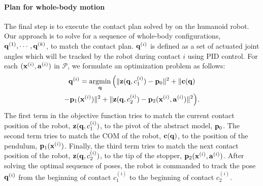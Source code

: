 \paragraph{Plan for whole-body motion}
The final step is to execute the contact plan solved by
 on the humanoid robot.  Our approach is to solve
for a sequence of whole-body configurations,
$\mathbf{q}^{(1)}, \cdots, \mathbf{q}^{(k)}$, to match the contact
plan. 
$\mathbf{q}^{(i)}$ is defined as a set of actuated joint angles
which will be tracked by the robot during contact $i$ using PID
control. For each $(\mathbf{x}^{(i)}, \mathbf{a}^{(i)})$ in $\mathcal{P}$, we
formulate an optimization problem as follows:
\begin{multline}
  \vc{q}^{(i)} = \argmin_{\vc{q}} \Big(
  \|\vc{z}(\vc{q}, c_1^{(i)}) - \vc{p}_0\|^2 +
  \|\vc{c}(\vc{q}) \\ - \vc{p}_1(\vc{x}^{(i)})\|^2 + 
  \|\vc{z}(\vc{q}, c_2^{(i)}) - \vc{p}_2(\vc{x}^{(i)}, \vc{a}^{(i)})\|^2  
  \Big).
\end{multline}
The first term in the objective function tries to match the current
contact position of the robot, $\mathbf{z}(\mathbf{q}, c_1^{(i)})$, to the
pivot of the abstract model, $\mathbf{p}_0$.
The second term tries to
match the COM of the robot, $\mathbf{c}(\mathbf{q})$, to the
position of the pendulum, $\mathbf{p}_1(\mathbf{x}^{(i)})$. Finally, the
third term tries to match the next contact position of the robot,
$\mathbf{z}(\mathbf{q}, c_2^{(i)})$, to the tip of the stopper,
$\mathbf{p}_2(\mathbf{x}^{(i)}, \mathbf{a}^{(i)})$.  After solving the optimal
sequence of poses, the robot is commanded to track the pose
$\mathbf{q}^{(i)}$ from the beginning of contact $c_1^{(i)}$ to the
beginning of contact $c_2^{(i)}$.


